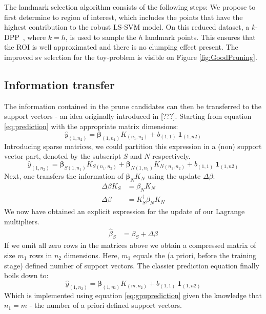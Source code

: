 \documentclass[preprint,12pt]{elsarticle}
\begin{document}
The landmark selection algorithm consists of the following steps:
We propose to first determine to region of interest, which includes the points that have the highest contribution to the robust LS-SVM model. On this reduced dataset, a $k$-DPP~\cite{kulesza2011k}, where $k = h$, is used to sample the $h$ landmark points. This ensures that the ROI is well approximated and there is no clumping effect present. The improved sv selection for the toy-problem is visible on Figure \ref{fig:GoodPruning}.



\subsection{Information transfer}
 The information contained in the prune candidates can then be transferred to the support vectors - an idea originally introduced in [???]. Starting from equation \ref{eq:prediction} with the appropriate matrix dimensions:
\begin{equation}
\hat{y}_{(1,n_2) } = \mathbf{\beta}_{(1,n_1)} K_{(n_1, n_2)} + b_{(1,1)} \ \mathbf{1}_{(1, n2)} 
\end{equation}
Introducing sparse matrices, we could partition this expression in a (non) support vector part, denoted by the subscript $S$ and $N$ respectively.
\begin{equation}
\hat{y}_{(1,n_2) } = \mathbf{\beta}_{S(1,n_1)} K_{S(n_1, n_2)} + \mathbf{\beta}_{N(1,n_1)} K_{N(n_1, n_2)} + b_{(1,1)} \ \mathbf{1}_{(1, n2)}
\end{equation}
Next, one transfers the information of $\mathbf{\beta}_{N} K_{N}$ using the update $\Delta\beta$: 
\begin{align}
\Delta \beta K_S &= \beta_N K_N  \\
\Delta \beta &= K^\dagger_S  \beta_N K_N
\end{align}
We now have obtained an explicit expression for the update of our Lagrange multipliers. 
\begin{align}
\hat{\beta}_S &= \beta_S + \Delta\beta
\end{align}
If we omit all zero rows in the matrices above we obtain a compressed matrix of size $m_1$ rows in $n_2$ dimensions. Here, $m_1$ equals the (a priori, before the training stage) defined number of support vectors. The classier prediction equation finally boils down to:
\begin{equation}
\hat{y}_{(1,n_2) } = \mathbf{\beta}_{(1,m)} K_{(m, n_2)} + b_{(1,1)} \ \mathbf{1}_{(1, n2)} 
\end{equation}
Which is implemented using equation \ref{eq:gpuprediction} given the knowledge that $n_1 = m$ - the number of a priori defined support vectors. \\
\end{document}
